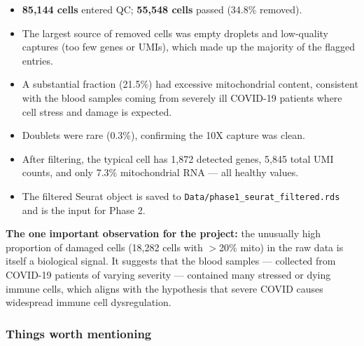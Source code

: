 \documentclass[11pt, a4paper]{article}
\begin{document}
\begin{itemize}[nosep]
  \item \textbf{85,144 cells} entered QC; \textbf{55,548 cells} passed (34.8\% removed).
  \item The largest source of removed cells was empty droplets and low-quality captures
        (too few genes or UMIs), which made up the majority of the flagged entries.
  \item A substantial fraction (21.5\%) had excessive mitochondrial content, consistent
        with the blood samples coming from severely ill COVID-19 patients where cell stress
        and damage is expected.
  \item Doublets were rare (0.3\%), confirming the 10X capture was clean.
  \item After filtering, the typical cell has 1,872 detected genes, 5,845 total UMI counts,
        and only 7.3\% mitochondrial RNA — all healthy values.
  \item The filtered Seurat object is saved to \texttt{Data/phase1\_seurat\_filtered.rds}
        and is the input for Phase 2.
\end{itemize}

\textbf{The one important observation for the project:} the unusually high proportion of
damaged cells (18,282 cells with $>$20\% mito) in the raw data is itself a biological
signal. It suggests that the blood samples — collected from COVID-19 patients of varying
severity — contained many stressed or dying immune cells, which aligns with the
hypothesis that severe COVID causes widespread immune cell dysregulation.

\subsubsection*{Things worth mentioning}
\end{document}
